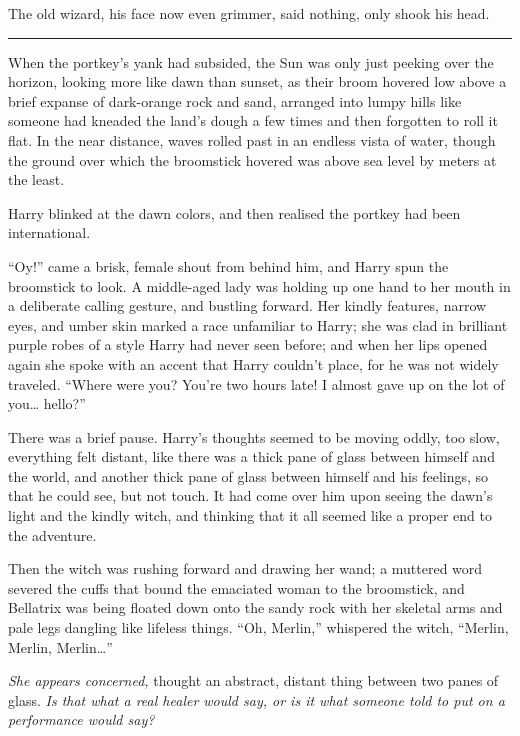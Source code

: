The old wizard, his face now even grimmer, said nothing, only shook his
head.

\begin{center}\rule{3in}{0.4pt}\end{center}

When the portkey's yank had subsided, the Sun was only just peeking over
the horizon, looking more like dawn than sunset, as their broom hovered
low above a brief expanse of dark-orange rock and sand, arranged into
lumpy hills like someone had kneaded the land's dough a few times and
then forgotten to roll it flat. In the near distance, waves rolled past
in an endless vista of water, though the ground over which the
broomstick hovered was above sea level by meters at the least.

Harry blinked at the dawn colors, and then realised the portkey had been
international.

``Oy!'' came a brisk, female shout from behind him, and Harry spun the
broomstick to look. A middle-aged lady was holding up one hand to her
mouth in a deliberate calling gesture, and bustling forward. Her kindly
features, narrow eyes, and umber skin marked a race unfamiliar to Harry;
she was clad in brilliant purple robes of a style Harry had never seen
before; and when her lips opened again she spoke with an accent that
Harry couldn't place, for he was not widely traveled. ``Where were you?
You're two hours late! I almost gave up on the lot of you\ldots{}
hello?''

There was a brief pause. Harry's thoughts seemed to be moving oddly, too
slow, everything felt distant, like there was a thick pane of glass
between himself and the world, and another thick pane of glass between
himself and his feelings, so that he could see, but not touch. It had
come over him upon seeing the dawn's light and the kindly witch, and
thinking that it all seemed like a proper end to the adventure.

Then the witch was rushing forward and drawing her wand; a muttered word
severed the cuffs that bound the emaciated woman to the broomstick, and
Bellatrix was being floated down onto the sandy rock with her skeletal
arms and pale legs dangling like lifeless things. ``Oh, Merlin,''
whispered the witch, ``Merlin, Merlin, Merlin\ldots{}''

\emph{She appears concerned,} thought an abstract, distant thing between
two panes of glass. \emph{Is that what a real healer would say, or is it
what someone told to put on a performance would say?}

